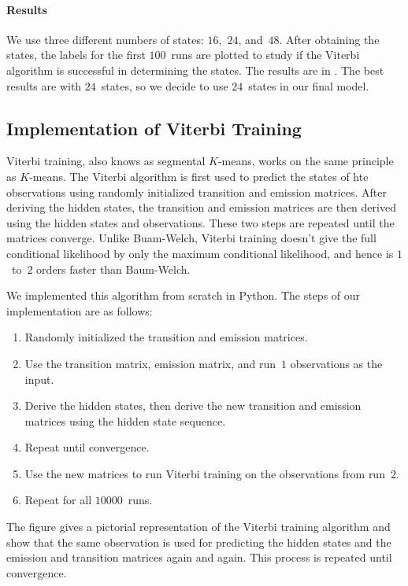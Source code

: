 \documentclass[twoside]{article}
\begin{document}
\paragraph{Results}

We use three different numbers of states: $16$,~$24$, and~$48$.
After obtaining the states, the labels for the first $100$~runs are plotted to study if the Viterbi algorithm is successful in determining the states.
The results are in . %
The best results are with $24$~states, so we decide to use $24$~states in our final model.

\subsection{Implementation of Viterbi Training}\label{sec:impl-viterbi-train}

Viterbi training, also knows as segmental $K$-means, works on the same principle as $K$-means.
The Viterbi algorithm is first used to predict the states of hte observations using randomly initialized transition and emission matrices.
After deriving the hidden states, the transition and emission matrices are then derived using the hidden states and observations.
These two steps are repeated until the matrices converge.
Unlike Buam-Welch, Viterbi training doesn't give the full conditional likelihood by only the maximum conditional likelihood, and hence is $1$~to~$2$ orders faster than Baum-Welch.

We implemented this algorithm from scratch in Python.
The steps of our implementation are as follows:
\begin{enumerate}
\item Randomly initialized the transition and emission matrices.
\item Use the transition matrix, emission matrix, and run~$1$ observations as the input.
\item Derive the hidden states, then derive the new transition and emission matrices using the hidden state sequence.
\item Repeat until convergence.
\item Use the new matrices to run Viterbi training on the observations from run~$2$.
\item Repeat for all $\num{10000}$~runs.
\end{enumerate}


The figure gives a pictorial representation of the Viterbi training algorithm and show that the same observation is used for predicting the hidden states and the emission and transition matrices again and again.
This process is repeated until convergence.
\end{document}
